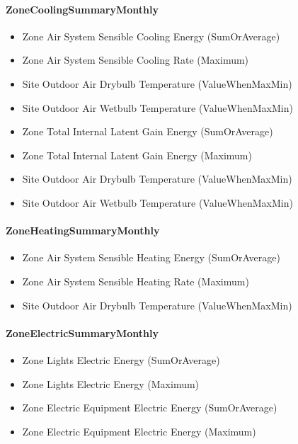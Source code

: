\paragraph{ZoneCoolingSummaryMonthly}\label{zonecoolingsummarymonthly}

\begin{itemize}
\item
  Zone Air System Sensible Cooling Energy (SumOrAverage)
\item
  Zone Air System Sensible Cooling Rate (Maximum)
\item
  Site Outdoor Air Drybulb Temperature (ValueWhenMaxMin)
\item
  Site Outdoor Air Wetbulb Temperature (ValueWhenMaxMin)
\item
  Zone Total Internal Latent Gain Energy (SumOrAverage)
\item
  Zone Total Internal Latent Gain Energy (Maximum)
\item
  Site Outdoor Air Drybulb Temperature (ValueWhenMaxMin)
\item
  Site Outdoor Air Wetbulb Temperature (ValueWhenMaxMin)
\end{itemize}

\paragraph{ZoneHeatingSummaryMonthly}\label{zoneheatingsummarymonthly}

\begin{itemize}
\item
  Zone Air System Sensible Heating Energy (SumOrAverage)
\item
  Zone Air System Sensible Heating Rate (Maximum)
\item
  Site Outdoor Air Drybulb Temperature (ValueWhenMaxMin)
\end{itemize}

\paragraph{ZoneElectricSummaryMonthly}\label{zoneelectricsummarymonthly}

\begin{itemize}
\item
  Zone Lights Electric Energy (SumOrAverage)
\item
  Zone Lights Electric Energy (Maximum)
\item
  Zone Electric Equipment Electric Energy (SumOrAverage)
\item
  Zone Electric Equipment Electric Energy (Maximum)
\end{itemize}

